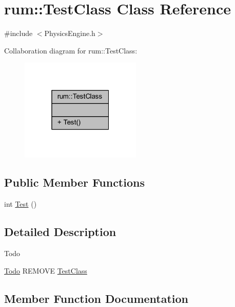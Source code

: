 \hypertarget{classrum_1_1_test_class}{}\section{rum\+:\+:Test\+Class Class Reference}
\label{classrum_1_1_test_class}


{\ttfamily \#include $<$Physics\+Engine.\+h$>$}



Collaboration diagram for rum\+:\+:Test\+Class\+:\nopagebreak
\begin{figure}[H]
\begin{center}
\leavevmode
\includegraphics[width=163pt]{classrum_1_1_test_class__coll__graph}
\end{center}
\end{figure}
\subsection*{Public Member Functions}
\begin{DoxyCompactItemize}
\item 
int \hyperlink{classrum_1_1_test_class_a88160ad1f781de9c35cb6b2f0e28a34d}{Test} ()
\end{DoxyCompactItemize}


\subsection{Detailed Description}
\begin{DoxyRefDesc}{Todo}
\item[\hyperlink{todo__todo000001}{Todo}]R\+E\+M\+O\+VE \hyperlink{classrum_1_1_test_class}{Test\+Class} \end{DoxyRefDesc}


\subsection{Member Function Documentation}
\mbox{\label{classrum_1_1_test_class_a88160ad1f781de9c35cb6b2f0e28a34d}} 

